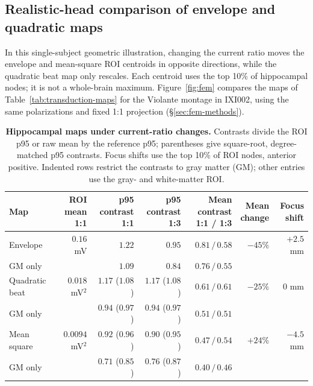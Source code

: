 \subsection{Realistic-head comparison of envelope and quadratic maps}\label{sec:fem-results}
In this single-subject geometric illustration, changing the current ratio
moves the envelope and mean-square ROI centroids in opposite directions,
while the quadratic beat map only rescales. Each centroid uses the top 10\%
of hippocampal nodes; it is not a whole-brain maximum.
Figure~\ref{fig:fem} compares the maps of Table~\ref{tab:transduction-maps}
for the Violante montage in IXI002, using the same polarizations and fixed
1:1 projection (\S\ref{sec:fem-methods}).

\begin{table}[htbp]
\centering\small
\caption{\textbf{Hippocampal maps under current-ratio changes.}
Contrasts divide the ROI p95 or raw mean by the reference p95; parentheses
give square-root, degree-matched p95 contrasts. Focus shifts use the top
10\% of ROI nodes, anterior positive. Indented rows restrict the contrasts
to gray matter (GM); other entries use the gray- and white-matter ROI.}
\label{tab:fem-summary}
\setlength{\tabcolsep}{4pt}
\begin{tabular}{@{}lrrrrrr@{}}
\toprule
Map & \shortstack{ROI mean\\1:1} & \shortstack{p95 contrast\\1:1} &
\shortstack{p95 contrast\\1:3} & \shortstack{Mean contrast\\1:1 / 1:3} &
\shortstack{Mean\\change} & \shortstack{Focus\\shift}\\
\midrule
Envelope & $0.16$ mV & $1.22$ & $0.95$ & $0.81\,/\,0.58$ & $-45\%$ & $+2.5$ mm\\
\quad GM only & & $1.09$ & $0.84$ & $0.76\,/\,0.55$ & & \\
Quadratic beat & $0.018$ mV$^2$ & $1.17$ ($1.08$) & $1.17$ ($1.08$) & $0.61\,/\,0.61$ & $-25\%$ & $0$ mm\\
\quad GM only & & $0.94$ ($0.97$) & $0.94$ ($0.97$) & $0.51\,/\,0.51$ & & \\
Mean square & $0.0094$ mV$^2$ & $0.92$ ($0.96$) & $0.90$ ($0.95$) & $0.47\,/\,0.54$ & $+24\%$ & $-4.5$ mm\\
\quad GM only & & $0.71$ ($0.85$) & $0.76$ ($0.87$) & $0.40\,/\,0.46$ & & \\
\bottomrule
\end{tabular}
\end{table}

